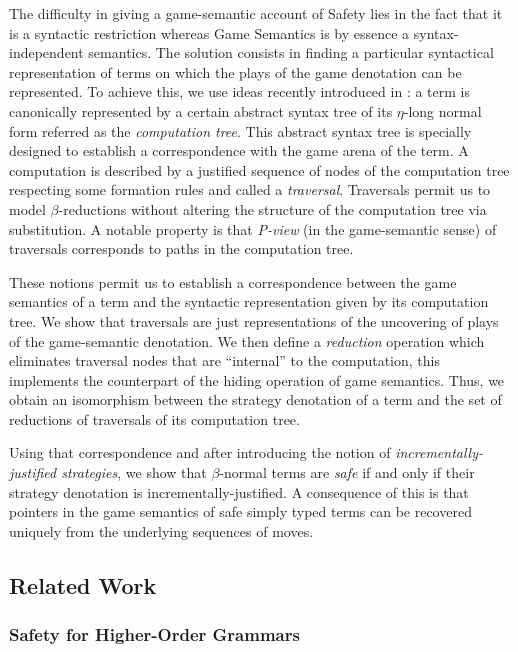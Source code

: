 \documentclass{llncs}
\begin{document}
The difficulty in giving a game-semantic account of Safety lies in the fact that it is a syntactic restriction whereas Game Semantics is by essence a syntax-independent semantics. The solution consists in finding a particular syntactical representation of terms on which the plays of the game denotation can be represented.
To achieve this, we use ideas recently introduced in \cite{OngLics2006}: a term is canonically represented by a certain abstract syntax tree of its $\eta$-long normal form referred as the \emph{computation tree}. This abstract syntax tree is specially designed to establish a correspondence with the game arena of the term. A computation is described by a justified sequence of nodes of the computation tree respecting some formation rules and called a \emph{traversal}. Traversals permit us to model $\beta$-reductions without altering the structure of the computation tree via substitution. A notable property is that \emph{P-view} (in the game-semantic sense) of traversals corresponds to paths in the computation tree.

These notions permit us to establish a correspondence between the game semantics of a term and the syntactic representation given by its computation tree. We show that traversals are just representations of the uncovering of plays of the game-semantic denotation. We then define a \emph{reduction} operation which eliminates traversal nodes that are ``internal'' to the computation, this implements the counterpart of the hiding operation of game semantics. Thus, we obtain an isomorphism between the strategy denotation of a term and the set of reductions of traversals of its computation tree.

Using that correspondence and after introducing the notion of \emph{incrementally-justified strategies}, we show that $\beta$-normal terms are \emph{safe} if and only if their strategy denotation is incrementally-justified. A consequence of this is that pointers in the game semantics of safe simply typed terms can be recovered uniquely from the underlying sequences of moves.

\subsection{Related Work}

\subsubsection{Safety for Higher-Order Grammars}
\end{document}
